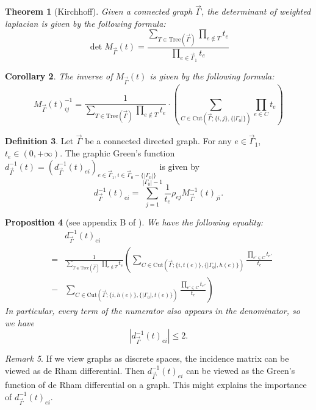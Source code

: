 \documentclass[11pt]{amsart}
\newtheorem{thm}{Theorem}[section]
\newtheorem{cor}[thm]{Corollary}
\newtheorem{prop}[thm]{Proposition}
\theoremstyle{definition}
\newtheorem{defn}[thm]{Definition}
\theoremstyle{remark}
\newtheorem{rem}[thm]{Remark}
\numberwithin{equation}{section}
\begin{document}
\begin{thm}[Kirchhoff]
  Given a connected graph $\vec{\Gamma}$, the determinant of
  weighted laplacian is given by the following formula:
  \[ \det M_{\vec{\Gamma}} (t) = \frac{\underset{T \in \mathrm{Tree} (\vec{\Gamma})}{\sum}
     \underset{e \notin T}{\prod} t_e}{\underset{e \in \vec{\Gamma}_1}{\prod} t_e} \]
\end{thm}

\begin{cor}\label{det of laplacian}
  The inverse of $M_{\vec{\Gamma}} (t)$ is given by the following
  formula:\label{Minverse}
  \[ M_{\vec{\Gamma}} (t)^{- 1}_{i j} = \frac{1}{\underset{T \in \mathrm{Tree}
     (\vec{\Gamma})}{\sum} \underset{e \notin T}{\prod} t_e} \cdot \left( \sum_{C \in
     \mathrm{Cut} (\vec{\Gamma} ; \{ i, j \}, \{ | \Gamma_0 | \})} \prod_{e \in C} t_e
     \right) \]
\end{cor}
\begin{defn}
    Let $\vec{\Gamma}$ be a connected directed graph. For any $e\in\vec{\Gamma}_{1}$, $t_e\in(0,+\infty)$. The graphic Green's function $d^{-1}_{\vec{\Gamma}}(t)=(d^{-1}_{\vec{\Gamma}}(t)_{ei})_{e\in\vec{\Gamma}_{1},i\in\vec{\Gamma}_{0}-\{| \Gamma_0 |\}}$ is given by
    $$
    d^{-1}_{\vec{\Gamma}}(t)_{ei}=\sum_{j=1}^{| \Gamma_0 |-1}\frac{1}{t_{e}}\rho_{ej}M^{-1}_{\vec{\Gamma}}(t)_{ji}.
    $$
\end{defn}

\begin{prop}[see appendix B of \cite{Li:2011mi}]
  \label{boundness}We have the following equality:
  \begin{eqnarray*}
    &  & d^{-1}_{\vec{\Gamma}}(t)_{ei}\\
    & = & \frac{1}{\underset{T \in \mathrm{Tree} (\vec{\Gamma})}{\sum} \underset{e
    \notin T}{\prod} t_e} \left( \sum_{C \in \mathrm{Cut} (\vec{\Gamma} ; \{ i, t (e)
    \}, \{ | \Gamma_0 |, h (e) \})} \frac{\prod_{e' \in C} t_{e'}}{t_e}
    \right.\\
    & - & \left. \sum_{C \in \mathrm{Cut} (\vec{\Gamma} ; \{ i, h (e) \}, \{ |
    \Gamma_0 |, t (e) \})} \frac{\prod_{e' \in C} t_{e'}}{t_e} \right)
  \end{eqnarray*}
  In particular, every term of the numerator also appears in the denominator,
  so we have
  \[ \left| d^{-1}_{\vec{\Gamma}}(t)_{ei} \right| \leqslant 2. \]
\end{prop}

\begin{rem}
  If we view graphs as discrete spaces, the incidence matrix can be viewed as
  de Rham differential. Then $d^{-1}_{\vec{\Gamma}}(t)_{ei}$ can be viewed as
  the Green's function of de Rham differential on a graph. This might explains
  the importance of $d^{-1}_{\vec{\Gamma}}(t)_{ei}$.
\end{rem}
\end{document}
